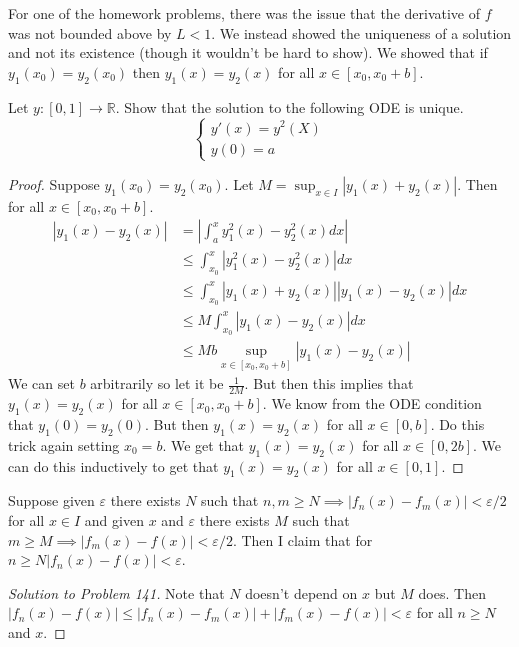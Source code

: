 \documentclass{article}
\newcommand{\R}{\mathbb{R}}
\newcommand{\eps}{\varepsilon}
\newcommand{\ra}[1][]{\xrightarrow{#1}}
\begin{document}
For one of the homework problems, there was the issue that the derivative of $f$ was not bounded above by $L<1$. We instead showed the uniqueness of a solution and not its existence (though it wouldn't be hard to show). We showed that if $y_1(x_0)=y_2(x_0)$ then $y_1(x)=y_2(x)$ for all $x\in [x_0,x_0+b]$.
\begin{problem}
  Let $y:[0,1]\ra \R$. Show that the solution to the following ODE is unique.
  \begin{equation*}
    \begin{cases}
      y'(x) = y^2(X) \\
      y(0) = a
    \end{cases}
  \end{equation*}
\end{problem}
\begin{proof}
  Suppose $y_1(x_0)=y_2(x_0)$. Let $M=\sup_{x\in I}|y_1(x)+y_2(x)|$. Then for all $x\in[x_0,x_0+b]$.
  \begin{equation*}
    \begin{split}
      |y_1(x)-y_2(x)| & = |\int_a^xy_1^2(x)-y_2^2(x)dx| \\
      & \leq \int_{x_0}^x | y_1^2(x)-y_2^2(x)|dx \\
      & \leq \int_{x_0}^x |y_1(x)+y_2(x)||y_1(x)-y_2(x)|dx \\
      & \leq M\int_{x_0}^x |y_1(x)-y_2(x)|dx \\
      & \leq Mb\sup_{x\in[x_0,x_0+b]}|y_1(x)-y_2(x)|
    \end{split}
  \end{equation*}
  We can set $b$ arbitrarily so let it be $\frac{1}{2M}$. But then this implies that $y_1(x)=y_2(x)$ for all $x\in[x_0,x_0+b]$. We know from the ODE condition that $y_1(0)=y_2(0)$. But then $y_1(x)=y_2(x)$ for all $x\in[0,b]$. Do this trick again setting $x_0=b$. We get that $y_1(x)=y_2(x)$ for all $x\in[0,2b]$.
  We can do this inductively to get that $y_1(x)=y_2(x)$ for all $x\in[0,1]$.
\end{proof}
\begin{problem}
  Suppose given $\eps$ there exists $N$ such that $n,m\geq N\implies |f_n(x)-f_m(x)|<\eps/2$ for all $x\in I$ and given $x$ and $\eps$ there exists $M$ such that $m\geq M\implies |f_m(x)-f(x)|<\eps/2$. Then I claim that for $n\geq N |f_n(x)-f(x)|<\eps$.
\end{problem}
\begin{proof}[Solution to Problem 141]
  Note that $N$ doesn't depend on $x$ but $M$ does. Then $|f_n(x)-f(x)|\leq |f_n(x)-f_m(x)|+|f_m(x)-f(x)|<\eps$ for all $n\geq N$ and $x$.
\end{proof}
\end{document}
